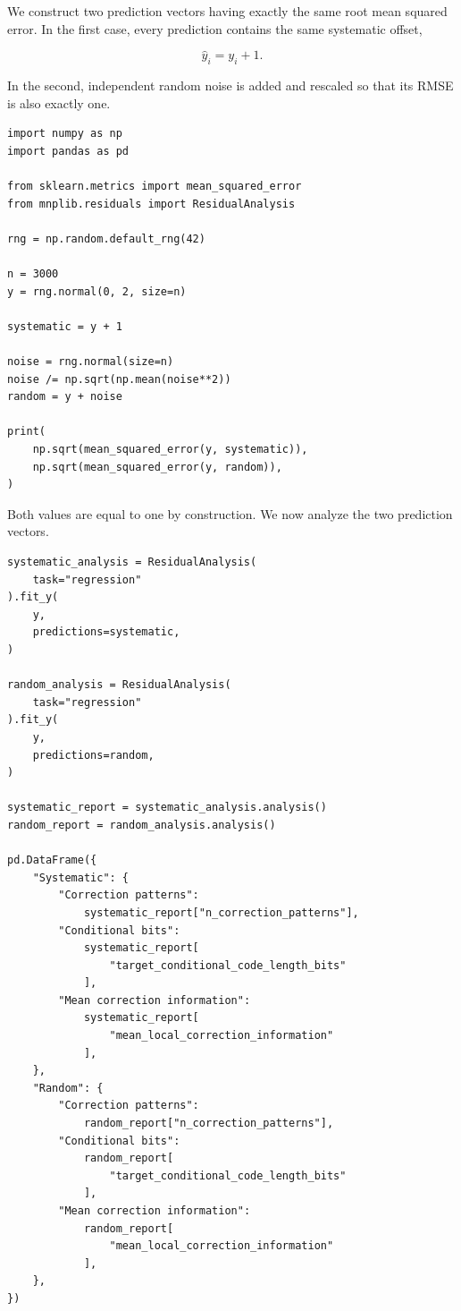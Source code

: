 \begin{example}
\label{ex:residual_systematic_random}

We construct two prediction vectors having exactly the same root mean squared
error. In the first case, every prediction contains the same systematic offset,

\[
\widehat y_i=y_i+1.
\]

In the second, independent random noise is added and rescaled so that its RMSE
is also exactly one.

\begin{sourcecode}
{\scriptsize
\begin{verbatim}
import numpy as np
import pandas as pd

from sklearn.metrics import mean_squared_error
from mnplib.residuals import ResidualAnalysis

rng = np.random.default_rng(42)

n = 3000
y = rng.normal(0, 2, size=n)

systematic = y + 1

noise = rng.normal(size=n)
noise /= np.sqrt(np.mean(noise**2))
random = y + noise

print(
    np.sqrt(mean_squared_error(y, systematic)),
    np.sqrt(mean_squared_error(y, random)),
)
\end{verbatim}}
\end{sourcecode}

Both values are equal to one by construction. We now analyze the two prediction
vectors.

\begin{sourcecode}
{\scriptsize
\begin{verbatim}
systematic_analysis = ResidualAnalysis(
    task="regression"
).fit_y(
    y,
    predictions=systematic,
)

random_analysis = ResidualAnalysis(
    task="regression"
).fit_y(
    y,
    predictions=random,
)

systematic_report = systematic_analysis.analysis()
random_report = random_analysis.analysis()

pd.DataFrame({
    "Systematic": {
        "Correction patterns":
            systematic_report["n_correction_patterns"],
        "Conditional bits":
            systematic_report[
                "target_conditional_code_length_bits"
            ],
        "Mean correction information":
            systematic_report[
                "mean_local_correction_information"
            ],
    },
    "Random": {
        "Correction patterns":
            random_report["n_correction_patterns"],
        "Conditional bits":
            random_report[
                "target_conditional_code_length_bits"
            ],
        "Mean correction information":
            random_report[
                "mean_local_correction_information"
            ],
    },
})
\end{verbatim}}
\end{sourcecode}


\end{example}
